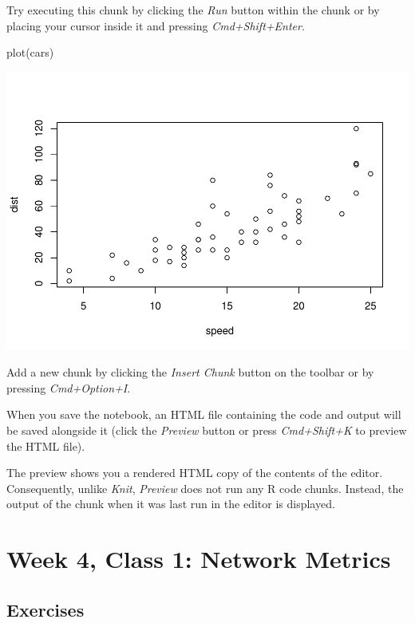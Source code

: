 \documentclass[
]{book}
\newenvironment{Shaded}{\begin{snugshade}}{\end{snugshade}}
\newcommand{\FunctionTok}[1]{\textcolor[rgb]{0.00,0.00,0.00}{#1}}
\newcommand{\NormalTok}[1]{#1}
\begin{document}
Try executing this chunk by clicking the \emph{Run} button within the chunk or by placing your cursor inside it and pressing \emph{Cmd+Shift+Enter}.

\begin{Shaded}
\begin{Highlighting}[]
\FunctionTok{plot}\NormalTok{(cars)}
\end{Highlighting}
\end{Shaded}

\includegraphics{_main_files/figure-latex/unnamed-chunk-31-1.pdf}

Add a new chunk by clicking the \emph{Insert Chunk} button on the toolbar or by pressing \emph{Cmd+Option+I}.

When you save the notebook, an HTML file containing the code and output will be saved alongside it (click the \emph{Preview} button or press \emph{Cmd+Shift+K} to preview the HTML file).

The preview shows you a rendered HTML copy of the contents of the editor. Consequently, unlike \emph{Knit}, \emph{Preview} does not run any R code chunks. Instead, the output of the chunk when it was last run in the editor is displayed.

\hypertarget{week-4-class-1-network-metrics}{%
\chapter{Week 4, Class 1: Network Metrics}\label{week-4-class-1-network-metrics}}

\hypertarget{exercises-1}{%
\section{Exercises}\label{exercises-1}}
\end{document}
